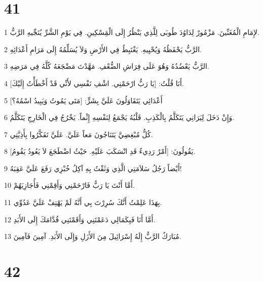 \chapter{41}

\par 1 لإِمَامِ الْمُغَنِّينَ. مَزْمُورٌ لِدَاوُدَ طُوبَى لِلَّذِي يَنْظُرُ إِلَى الْمَِسْكِينِ. فِي يَوْمِ الشَّرِّ يُنَجِّيهِ الرَّبُّ.
\par 2 الرَّبُّ يَحْفَظُهُ وَيُحْيِيهِ. يَغْتَبِطُ فِي الأَرْضِ وَلاَ يُسَلِّمُهُ إِلَى مَرَامِ أَعْدَائِهِ.
\par 3 الرَّبُّ يَعْضُدُهُ وَهُوَ عَلَى فِرَاشِ الضُّعْفِ. مَهَّدْتَ مَضْجَعَهُ كُلَّهُ فِي مَرَضِهِ.
\par 4 أَنَا قُلْتُ: [يَا رَبُّ ارْحَمْنِي. اشْفِ نَفْسِي لأَنِّي قَدْ أَخْطَأْتُ إِلَيْكَ].
\par 5 أَعْدَائِي يَتَقَاوَلُونَ عَلَيَّ بِشَرٍّ: [مَتَى يَمُوتُ وَيَبِيدُ اسْمُهُ؟]
\par 6 وَإِنْ دَخَلَ لِيَرَانِي يَتَكَلَّمُ بِالْكَذِبِ. قَلْبُهُ يَجْمَعُ لِنَفْسِهِ إِثْماً. يَخْرُجُ فِي الْخَارِجِ يَتَكَلَّمُ.
\par 7 كُلُّ مُبْغِضِيَّ يَتَنَاجُونَ مَعاً عَلَيَّ. عَلَيَّ تَفَكَّرُوا بِأَذِيَّتِي.
\par 8 يَقُولُونَ: [أَمْرٌ رَدِيءٌ قَدِ انْسَكَبَ عَلَيْهِ. حَيْثُ اضْطَجَعَ لاَ يَعُودُ يَقُومُ].
\par 9 أَيْضاً رَجُلُ سَلاَمَتِي الَّذِي وَثَقْتُ بِهِ آكِلُ خُبْزِي رَفَعَ عَلَيَّ عَقِبَهُ!
\par 10 أَمَّا أَنْتَ يَا رَبُّ فَارْحَمْنِي وَأَقِمْنِي فَأُجَازِيَهُمْ.
\par 11 بِهَذَا عَلِمْتُ أَنَّكَ سُرِرْتَ بِي أَنَّهُ لَمْ يَهْتِفْ عَلَيَّ عَدُوِّي.
\par 12 أَمَّا أَنَا فَبِكَمَالِي دَعَمْتَنِي وَأَقَمْتَنِي قُدَّامَكَ إِلَى الأَبَدِ.
\par 13 مُبَارَكٌ الرَّبُّ إِلَهُ إِسْرَائِيلَ مِنَ الأَزَلِ وَإِلَى الأَبَدِ. آمِينَ فَآمِينَ.

\chapter{42}

